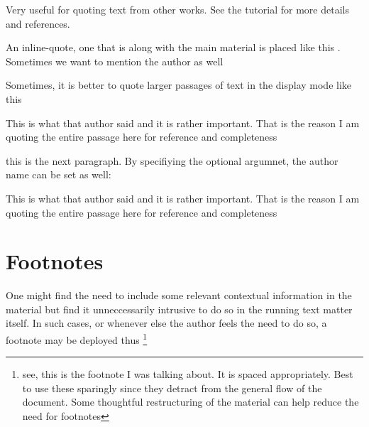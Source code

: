Very useful for quoting text from other works. See the tutorial for more
details and references.

An inline-quote, one that is along with the main material is placed like this
. Sometimes we want to mention the author as well

Sometimes, it is better to quote larger passages of text in the display mode
like this

\begin{displayquote}
This is what that author said and it is rather important. That is the reason I
am quoting the entire passage here for reference and completeness
\end{displayquote}

this is the next paragraph. By specifiying the optional argumnet, the author
name can be set as well:

\begin{displayquote}[Authorname]
This is what that author said and it is rather important. That is the reason I
am quoting the entire passage here for reference and completeness
\end{displayquote}

\section{Footnotes}
One might find the need to include some relevant contextual information in the
material but find it unneccessarily intrusive to do so in the running text
matter itself. In such cases, or whenever else the author feels the need to do
so, a footnote may be deployed thus \footnote{see, this is the footnote I was
talking about. It is spaced appropriately. Best to use these sparingly since
they detract from the general flow of the document. Some thoughtful
restructuring of the material can help reduce the need for footnotes}